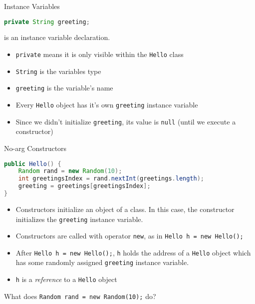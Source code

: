 \documentclass{beamer}
\begin{document}
\begin{frame}[fragile]{Instance Variables}


\begin{lstlisting}[language=Java]
  private String greeting;
\end{lstlisting}
is an instance variable declaration.
\begin{itemize}
\item {\tt private} means it is only visible within the {\tt Hello} class
\item {\tt String} is the variables type
\item {\tt greeting} is the variable's name
\item Every {\tt Hello} object has it's own {\tt greeting} instance variable
\item Since we didn't initialize {\tt greeting}, its value is {\tt null} (until we execute a constructor)
\end{itemize}


\end{frame}

\begin{frame}[fragile]{No-arg Constructors}


\begin{lstlisting}[language=Java]
public Hello() {
    Random rand = new Random(10);
    int greetingsIndex = rand.nextInt(greetings.length);
    greeting = greetings[greetingsIndex];
}
\end{lstlisting}

\begin{itemize}
\item Constructors initialize an object of a class.  In this case, the constructor initializes the {\tt greeting} instance variable.
\item Constructors are called with operator {\tt new}, as in {\tt Hello h = new Hello();}
\item After {\tt Hello h = new Hello();}, {\tt h} holds the address of a {\tt Hello} object which has some randomly assigned {\tt greeting} instance variable.
\item {\tt h} is a {\it reference} to a {\tt Hello} object
\end{itemize}

What does {\tt Random rand = new Random(10);} do?

\end{frame}
\end{document}
